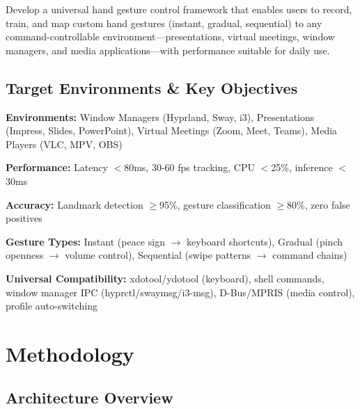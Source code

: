 \documentclass[11pt]{article}
\begin{document}
Develop a universal hand gesture control framework that enables users to record, train, and map custom hand gestures (instant, gradual, sequential) to any command-controllable environment—presentations, virtual meetings, window managers, and media applications—with performance suitable for daily use.

\subsection{Target Environments \& Key Objectives}

\textbf{Environments:} Window Managers (Hyprland, Sway, i3), Presentations (Impress, Slides, PowerPoint), Virtual Meetings (Zoom, Meet, Teams), Media Players (VLC, MPV, OBS)

\textbf{Performance:} Latency $<$80ms, 30-60 fps tracking, CPU $<$25\%, inference $<$30ms

\textbf{Accuracy:} Landmark detection $\geq$95\%, gesture classification $\geq$80\%, zero false positives

\textbf{Gesture Types:} Instant (peace sign $\rightarrow$ keyboard shortcuts), Gradual (pinch openness $\rightarrow$ volume control), Sequential (swipe patterns $\rightarrow$ command chains)

\textbf{Universal Compatibility:} xdotool/ydotool (keyboard), shell commands, window manager IPC (hyprctl/swaymsg/i3-msg), D-Bus/MPRIS (media control), profile auto-switching

\section{Methodology}

\subsection{Architecture Overview}
\end{document}
